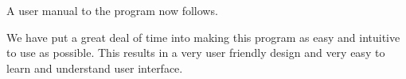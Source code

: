 A user manual to the program now follows.

We have put a great deal of time into making this program as easy and intuitive to use as possible. This results in a very user friendly design and very easy to learn and understand user interface. 
